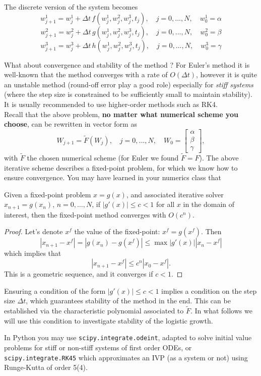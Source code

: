 The discrete version of the system becomes 
\[  w^1_{j+1} = w^1_j + \Delta t \, f(w^1_j,w^2_j,w^3_j,t_j) ,   \quad  j = 0, ...,N, \quad w_0^1 = \alpha \]
\[  w^2_{j+1} = w^2_j + \Delta t \,  g(w^1_j,w^2_j,w^3_j,t_j),   \quad j = 0, ...,N, \quad w_0^2 = \beta\]
\[  w^3_{j+1} = w^3_j + \Delta t \,  h(w^1_j,w^2_j,w^3_j,t_j),   \quad  j = 0, ...,N, \quad w_0^3 = \gamma \]

What about convergence and stability of the method ? For Euler's method it is well-known that the method converges with a rate of $O(\Delta t)$, however it is quite an unstable method (round-off error play a good role) especially for \textit{stiff systems} (where the step size is constrained to be sufficiently small to maintain stability). It is usually recommended to use higher-order methods such as RK4. \\ 

Recall that the above problem, \textbf{no matter what numerical scheme you choose}, can be rewritten in vector form as 
\[  W_{j+1} = \tilde{F}( W_j ),   \quad  j = 0, ...,N, \quad W_0 =  \begin{bmatrix}
\alpha \\ \beta  \\ \gamma
\end{bmatrix},\]
with $\tilde{F}$ the chosen numerical scheme (for Euler we found $\tilde{F} = F$). The above iterative scheme describes a fixed-point problem, for which we know how to ensure convergence. You may have learned in your numerics class that 
\begin{lemma}\label{lem:fp}
Given a fixed-point problem $x = g(x)$, and associated iterative solver $x_{n+1} = g(x_n)$, $n = 0, \dots, N$, if $|g'(x)| \leq c < 1$ for all $x$ in the domain of interest, then the fixed-point method converges with $O(c^n)$.
\end{lemma}
\begin{proof}
Let's denote $x^f$ the value of the fixed-point: $x^f = g(x^f)$. Then
\[ |x_{n+1} - x^f| = |g(x_{n}) - g(x^f)| \leq \max |g'(x)| |x_n  - x^f|\]
which implies that 
\[ |x_{n+1} - x^f|  \leq c^n |x_0 -x^f|.\]
This is a geometric sequence, and it converges if $c <1$. 
\end{proof}
Ensuring a condition of the form $|g'(x)| \leq c < 1$ implies a condition on the step size $\Delta t$, which guarantees stability of the method in the end. This can be established via the characteristic polynomial associated to $\tilde{F}$.  In what follows we will use this condition to investigate stability of the logistic growth.\\
\begin{remark}
In Python you may use \texttt{scipy.integrate.odeint}, adapted to solve initial value problems for stiff or non-stiff systems of first order ODEs, or \texttt{scipy.integrate.RK45} which approximates an IVP (as a system or not) using Runge-Kutta of order 5(4).
\end{remark}

